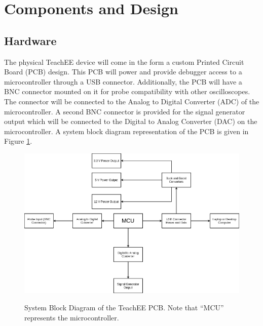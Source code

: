 \documentclass[letterpaper,12pt]{article}
\begin{document}
\section{Components and Design}
\subsection{Hardware} %
The physical TeachEE device will come in the form a custom Printed Circuit Board
(PCB) design. This PCB will power and provide debugger access
to a microcontroller through a USB connector. Additionally, the PCB will have a
BNC connector mounted on it for probe compatibility with other oscilloscopes.
The connector will be connected to the Analog to Digital Converter (ADC) of the
microcontroller. A second BNC connector is provided for the signal generator
output which will be connected to the Digital to Analog Converter (DAC) on the
microcontroller. A system block diagram representation of the PCB is given in
Figure \ref{fig:block-diagram-pcb}.

\begin{figure}[h!]
    \centering
    \caption{System Block Diagram of the TeachEE PCB. Note that ``MCU'' represents the microcontroller.}
    \includegraphics[width=\textwidth]{figures/pcb-block-diagram.png}
    \label{fig:block-diagram-pcb}
\end{figure}
\FloatBarrier
\end{document}
